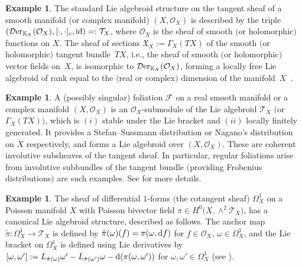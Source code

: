 \documentclass[pdftex]{sigma}
\numberwithin{equation}{section}
\theoremstyle{definition}
\newtheorem{Exm}[Thm]{Example}
\begin{document}
\begin{Exm} \label{Example8}
The standard Lie algebroid structure on the tangent sheaf of a smooth manifold (or complex manifold) $(X, \mathcal{O}_X)$ is described by the triple $(\mathcal{D}{\rm er}_{\mathbb{K}_X}(\mathcal{O}_X), [\cdot,\cdot]_c, {\rm id})=:\mathcal{T}_X$, where $\mathcal{O}_X$ is the sheaf of smooth $($or holomorphic$)$ functions on $X$. The sheaf of sections ${\mathfrak{X}_X:=\Gamma_X(TX)}$ of the smooth $($or holomorphic$)$ tangent bundle~$TX$, i.e., the sheaf of smooth $($or holomorphic$)$ vector fields on~$X$, is isomorphic to $\mathcal{D}{\rm er}_{\mathbb{K}_X}(\mathcal{O}_X)$, forming a locally free Lie algebroid of rank equal to the $($real or complex$)$ dimension of the manifold~$X$~\cite{SR}.
\end{Exm}

\begin{Exm} \label{Foliation}
A (possibly singular) foliation $\mathcal{F}$ on a real smooth manifold or a complex manifold $(X, \mathcal{O}_X)$ is an $\mathcal{O}_X$-submodule of the Lie algebroid $\mathcal{T}_X$ $($or $\Gamma_X(TX))$, which is $(i)$ stable under the Lie bracket and $(ii)$ locally finitely generated. It provides a Stefan--Sussmann distribution or Nagano's distribution on $X$ respectively, and forms a Lie algebroid over $(X, \mathcal{O}_X)$.
	These are coherent involutive subsheaves of the tangent sheaf.
	In particular, regular foliations arise from involutive subbundles of the tangent bundle $($providing Frobenius distributions$)$ are such examples. See \cite{IAGS, RF, LGLRLR, CL, BP} for more details.
\end{Exm}
\begin{Exm} \label{Cotantgent Poisson}
	The sheaf of differential $1$-forms $($the cotangent sheaf$)$ $\Omega^1_X$ on a Poisson mani\-fold $X$ with Poisson bivector field $\pi \in H^0\bigl(X, \wedge^2 \mathcal{T}_X\bigr)$, has a canonical Lie algebroid structure, described as follows.
	The anchor map $\tilde{\pi}\colon \Omega^1_X \rightarrow \mathcal{T}_X$ is defined by $\tilde{\pi}(\omega) (f)= \pi(\omega, {\rm d}f)$ for $f \in \mathcal{O}_X$, $\omega \in \Omega^1_X$, and the Lie bracket on $\Omega^1_X$ is defined using Lie derivatives by
$[\omega, \omega']:= L_{\tilde{\pi}(\omega)} \omega' - L_{\tilde{\pi}(\omega')} \omega - {\rm d}(\pi(\omega, \omega'))$ for $\omega, \omega' \in \Omega^1_X$ (see \cite{RF, BP}).
\end{Exm}	
\end{document}
